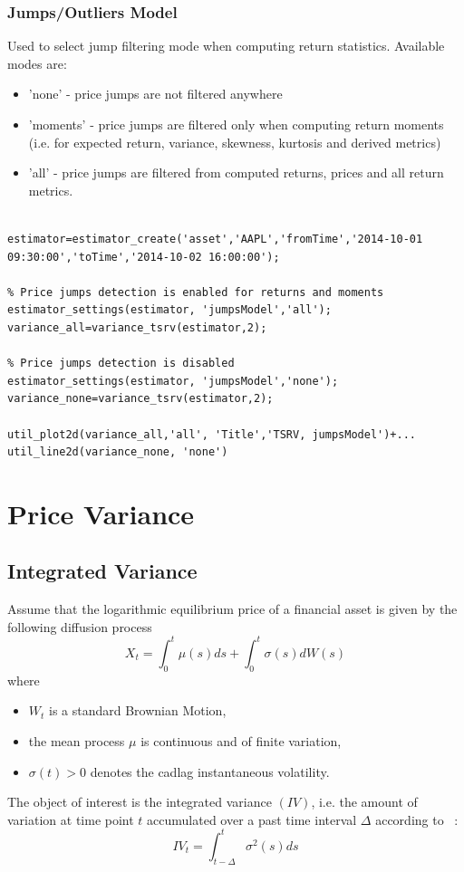 \documentclass[letterpaper]{report}
\begin{document}
\subsection{Jumps/Outliers Model}
Used to select jump filtering mode when computing return statistics. Available modes are: 
\begin{itemize} 
  \item 'none' - price jumps are not filtered anywhere
  \item 'moments' - price jumps are filtered only when computing return moments
  (i.e. for expected return, variance, skewness, kurtosis and derived
  metrics)
  \item 'all' - price jumps are filtered from computed returns, prices and all
   return metrics.
\end{itemize}
\begin{lstlisting}

estimator=estimator_create('asset','AAPL','fromTime','2014-10-01 09:30:00','toTime','2014-10-02 16:00:00');

% Price jumps detection is enabled for returns and moments
estimator_settings(estimator, 'jumpsModel','all');
variance_all=variance_tsrv(estimator,2);

% Price jumps detection is disabled
estimator_settings(estimator, 'jumpsModel','none');
variance_none=variance_tsrv(estimator,2);

util_plot2d(variance_all,'all', 'Title','TSRV, jumpsModel')+...
util_line2d(variance_none, 'none')
\end{lstlisting}


\chapter{Price Variance}
\section{Integrated Variance}
Assume that the logarithmic equilibrium price of a financial asset is given by the following
diffusion process
\begin{equation}
X_t = \int_0^t \mu(s)ds + \int_0^t \sigma(s)dW(s)
\end{equation}
where

\begin{itemize}
\item $W_t$ is a standard Brownian Motion,
\item the mean process $\mu$ is continuous and of finite variation,
\item $\sigma(t) >0$ denotes the cadlag instantaneous volatility.
\end{itemize}
\noindent The object of interest is the integrated variance $(IV)$, i.e. the
amount of variation at time point $t$ accumulated over a past time interval
$\Delta$ according to ~\cite[Pigorsch et al.]{Pigorsch_Pigorsch_Popov}:
\begin{equation}
IV_t = \int_{t-\Delta}^t \sigma^2(s)ds
\end{equation}
\end{document}
